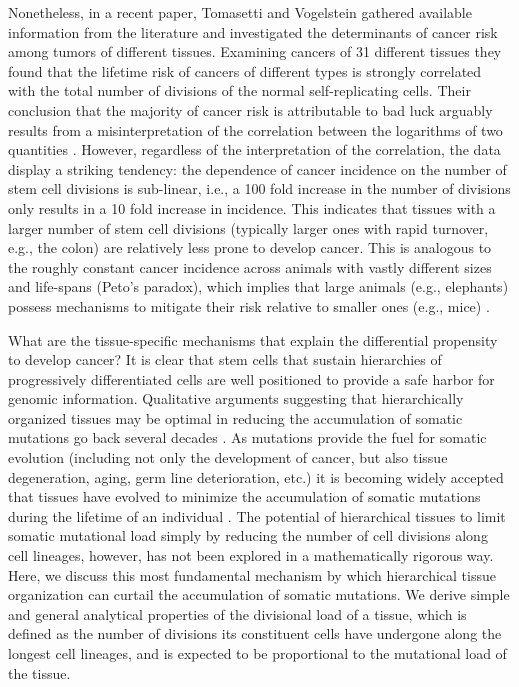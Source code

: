 \documentclass[aps,singlecolumn]{revtex4-1}
\begin{document}
Nonetheless, in a recent paper, Tomasetti and Vogelstein
\cite{Tomasetti:2015} gathered available information from the
literature and investigated the determinants of cancer risk among
tumors of different tissues. Examining cancers of 31 different tissues
they found that the lifetime risk of cancers of different types is
strongly correlated with the total number of divisions of the normal
self-replicating cells. Their conclusion that the majority of cancer
risk is attributable to bad luck \cite{Tomasetti:2015} arguably results
from a misinterpretation of the correlation between the logarithms of
two quantities \cite{Wild:2015,Wu:2016}. However, regardless of the
interpretation of the correlation, the data display a striking
tendency: the dependence of cancer incidence on the number of stem cell
divisions is sub-linear, i.e., a 100 fold increase in the number of
divisions only results in a 10 fold increase in incidence. This
indicates that tissues with a larger number of stem cell divisions
(typically larger ones with rapid turnover, e.g., the colon) are
relatively less prone to develop cancer. This is analogous to the
roughly constant cancer incidence across animals with vastly different
sizes and life-spans (Peto's paradox), which implies that large animals
(e.g., elephants) possess mechanisms to mitigate their risk relative to
smaller ones (e.g., mice) \cite{Peto:1975,Caulin:2011,Peto:2015}.

What are the tissue-specific mechanisms that explain the differential
propensity to develop cancer?
It is clear that stem cells that sustain hierarchies of progressively
differentiated cells are well positioned to provide a safe
harbor for genomic information.
Qualitative arguments suggesting that hierarchically organized
tissues may be optimal in reducing the accumulation of somatic
mutations go back several decades \cite{Hindersin:2016}.
%
As mutations provide the fuel for somatic evolution (including not only
the development of cancer, but also tissue degeneration, aging, germ
line deterioration, etc.) it is becoming widely
accepted that tissues have evolved to minimize the accumulation of
somatic mutations during the lifetime of an individual
\cite{Hindersin:2016}.
%
The potential of hierarchical
tissues to limit somatic mutational load simply by reducing the number of cell
divisions along cell lineages, however, has not been explored in a
mathematically rigorous way. Here, we discuss this most fundamental mechanism by which hierarchical
tissue organization can curtail the accumulation of somatic
mutations. We derive simple and general analytical properties of the divisional load of a
tissue, which is defined as the number of divisions its constituent
cells have undergone along the longest cell lineages,
and is expected to be proportional to the
mutational load of the tissue.
\end{document}
